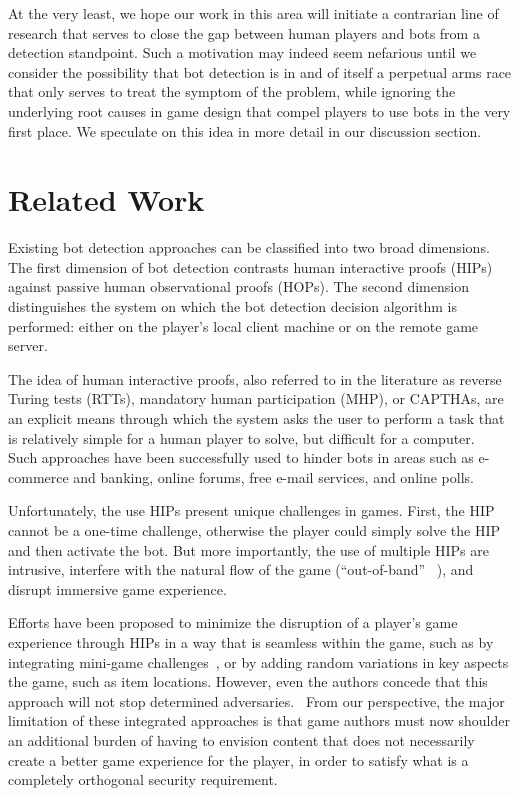 \documentclass{acm_proc_article-sp}
\begin{document}
At the very least, we hope our work in this area will initiate a contrarian line of research that serves to close the gap between human players and bots from a detection standpoint. Such a motivation may indeed seem nefarious until we consider the possibility that bot detection is in and of itself a perpetual arms race that only serves to treat the symptom of the problem, while ignoring the underlying root causes in game design that compel players to use bots in the very first place. We speculate on this idea in more detail in our discussion section.

\section{Related Work}

Existing bot detection approaches can be classified into two broad dimensions. The first dimension of bot detection contrasts human interactive proofs (HIPs) against passive human observational proofs (HOPs). The second dimension distinguishes the system on which the bot detection decision algorithm is performed: either on the player's local client machine or on the remote game server.

The idea of human interactive proofs, also referred to in the literature as reverse Turing tests (RTTs), mandatory human participation (MHP), or CAPTHAs, are an explicit means through which the system asks the user to perform a task that is relatively simple for a human player to solve, but difficult for a computer.~\cite{embedpoker} Such approaches have been successfully used to hinder bots in areas such as e-commerce and banking, online forums, free e-mail services, and online polls.

Unfortunately, the use HIPs present unique challenges in games. First, the HIP cannot be a one-time challenge, otherwise the player could simply solve the HIP and then activate the bot. But more importantly, the use of multiple HIPs are intrusive, interfere with the natural flow of the game (``out-of-band'' ~\cite{preventbotitem}), and disrupt immersive game experience.

Efforts have been proposed to minimize the disruption of a player's game experience through HIPs in a way that is seamless within the game, such as by integrating mini-game challenges~\cite{minigame}, or by adding random variations in key aspects the game, such as item locations. However, even the authors concede that this approach will not stop determined adversaries.~\cite{preventbotitem} From our perspective, the major limitation of these integrated approaches is that game authors must now shoulder an additional burden of having to envision content that does not necessarily create a better game experience for the player, in order to satisfy what is a completely orthogonal security requirement.
\end{document}
